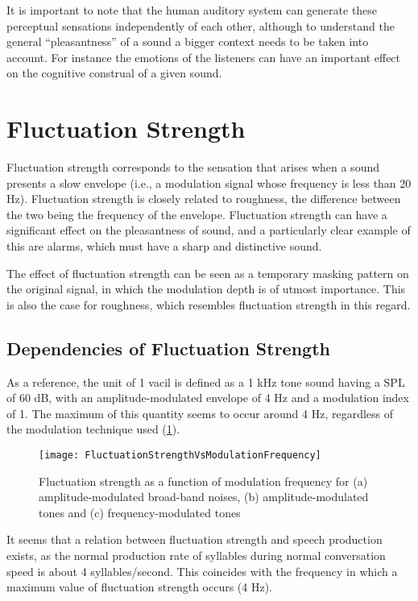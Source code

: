 \documentclass[../main.tex]{subfiles}
\begin{document}
\begin{theoreticalbackground}
It is important to note that the human auditory system can generate these
perceptual sensations independently of each other, although to understand the
general ``pleasantness'' of a sound a bigger context needs to be taken into
account. For instance the emotions of the listeners can have an important
effect on the cognitive construal of a given sound.

\section{Fluctuation Strength}


Fluctuation strength corresponds to the sensation that arises when a sound
presents a slow envelope (i.e., a modulation signal whose frequency is less than
20 Hz). Fluctuation strength is closely related to roughness, the difference
between the two being the frequency of the envelope.
Fluctuation strength can have a significant effect on the pleasantness of sound,
and a particularly clear example of this are alarms, which must have a sharp and
distinctive sound.

The effect of fluctuation strength can be seen as a temporary masking pattern on
the original signal, in which the modulation depth is of utmost importance. This
is also the case for roughness, which resembles fluctuation strength in this
regard.

\subsection{Dependencies of Fluctuation Strength}

As a reference, the unit of 1 vacil is defined as a 1 kHz tone sound having a
SPL of 60 dB, with an amplitude-modulated envelope of 4 Hz and a modulation
index of 1. The maximum of this quantity seems to occur around 4 Hz, regardless
of the modulation technique used (\cref{fig:flucstrenvmodfreq}).

\begin{figure}
  \centering
  \texttt{[image: FluctuationStrengthVsModulationFrequency]}
  \caption{Fluctuation strength as a function of modulation frequency for (a)
    amplitude-modulated broad-band noises, (b) amplitude-modulated tones and (c)
    frequency-modulated tones~\cite[pp.~248]{Fastl2007Psychoacoustics}}
\label{fig:flucstrenvmodfreq}
\end{figure}

It seems that a relation between fluctuation strength and speech production
exists, as the normal production rate of syllables during normal conversation
speed is about 4 syllables/second. This coincides with the frequency in which a
maximum value of fluctuation strength occurs (4 Hz).


\end{theoreticalbackground}
\end{document}
